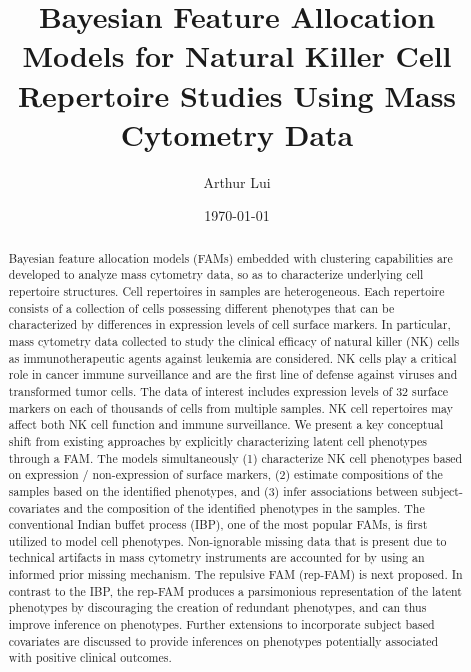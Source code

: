 \documentclass[12pt,]{article}
\title{Bayesian Feature Allocation Models for Natural Killer Cell Repertoire Studies Using Mass Cytometry Data}
\author{Arthur Lui}
\date{\today}
\begin{document}
\maketitle
\onehalfspacing



\begin{abstract}
\noindent
Bayesian feature allocation models (FAMs) embedded with clustering capabilities
are developed to analyze mass cytometry data, so as to characterize underlying
cell repertoire structures. Cell repertoires in samples are heterogeneous. Each
repertoire consists of a collection of cells possessing different phenotypes
that can be characterized by differences in expression levels of cell surface
markers.  In particular, mass cytometry data collected to study the clinical
efficacy of natural killer (NK) cells as immunotherapeutic agents against
leukemia are considered. NK cells play a critical role in cancer immune
surveillance and are the first line of defense against viruses and transformed
tumor cells.  The data of interest includes expression levels of 32 surface
markers on each of thousands of cells from multiple samples. NK cell
repertoires may affect both NK cell function and immune surveillance. We 
present a key conceptual shift from existing approaches by explicitly
characterizing latent cell phenotypes through a FAM. The models simultaneously
(1) characterize NK cell phenotypes based on expression / non-expression of
surface markers, (2) estimate compositions of the samples based on the
identified phenotypes, and (3) infer associations between subject-covariates
and the composition of the identified phenotypes in the samples.  The
conventional Indian buffet process (IBP), one of the most popular FAMs, is
first utilized to model cell phenotypes.  Non-ignorable missing data that is
present due to technical artifacts in mass cytometry instruments are accounted
for by using an informed prior missing mechanism. The repulsive FAM (rep-FAM)
is next proposed.  In contrast to the IBP, the rep-FAM produces a
parsimonious representation of the latent phenotypes by discouraging the
creation of redundant phenotypes, and can thus improve inference on phenotypes.
Further extensions to incorporate subject based covariates are discussed to
provide inferences on phenotypes potentially associated with positive clinical
outcomes.

\end{abstract}
\end{document}
